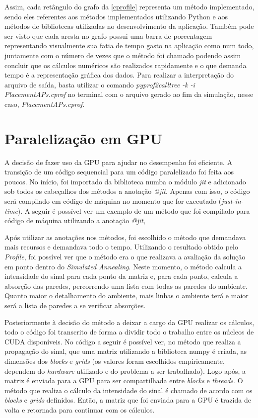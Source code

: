 \documentclass[
	12pt,				%
	twoside,			%
	a4paper,			%
	english,			%
	french,				%
	spanish,			%
	brazil				%
	]{abntex2}
\begin{document}
Assim, cada retângulo do grafo da \autoref{cprofile} representa um
método implementado, sendo eles referentes aos métodos implementados
utilizando Python e aos métodos de bibliotecas utilizadas no
desenvolvimento da aplicação. Também pode ser visto que cada aresta no
grafo possui uma barra de porcentagem representando visualmente sua
fatia de tempo gasto na aplicação como num todo, juntamente com o número
de vezes que o método foi chamado podendo assim concluir que os cálculos
numéricos são realizados rapidamente e o que demanda tempo é a
representação gráfica dos dados. Para realizar a interpretação do
arquivo de saída, basta utilizar o comando \emph{pyprof2calltree -k -i
PlacementAPs.cprof} no terminal com o arquivo gerado ao fim da
simulação, nesse caso, \emph{PlacementAPs.cprof}.

\section{Paralelização em GPU}\label{paralelizauxe7uxe3o-em-gpu}

A decisão de fazer uso da GPU para ajudar no desempenho foi eficiente. A
transição de um código sequencial para um código paralelizado foi feita
aos poucos. No início, foi importado da biblioteca numba o módulo
\emph{jit} e adicionado sob todos os cabeçalhos dos métodos a anotação
\emph{@jit}. Apenas com isso, o código será compilado em código de
máquina no momento que for executado (\emph{just-in-time}). A seguir é
possível ver um exemplo de um método que foi compilado para código de
máquina utilizando a anotação \emph{@jit},



Após utilizar as anotações nos métodos, foi escolhido o método que
demandava mais recursos e demandava todo o tempo. Utilizando o resultado
obtido pelo \emph{Profile}, foi possível ver que o método era o que
realizava a avaliação da solução em ponto dentro do \emph{Simulated
Annealing}. Neste momento, o método calcula a intensidade do sinal para
cada ponto da matriz e, para cada ponto, calcula a absorção das paredes,
percorrendo uma lista com todas as paredes do ambiente. Quanto maior o
detalhamento do ambiente, mais linhas o ambiente terá e maior será a
lista de paredes a se verificar absorções.

Posteriormente à decisão do método a deixar a cargo da GPU realizar os
cálculos, todo o código foi transcrito de forma a dividir todo o
trabalho entre os núcleos de CUDA disponíveis. No código a seguir é
possível ver, no método que realiza a propagação do sinal, que uma
matriz utilizando a biblioteca numpy é criada, as dimensões dos
\emph{blocks} e \emph{grids} (os valores foram escolhidos empiricamente,
dependem do \emph{hardware} utilizado e do problema a ser trabalhado).
Logo após, a matriz é enviada para a GPU para ser compartilhada entre
\emph{blocks} e \emph{threads}. O método que realiza o cálculo da
intensidade do sinal é chamado de acordo com os \emph{blocks} e
\emph{grids} definidos. Então, a matriz que foi enviada para a GPU é
trazida de volta e retornada para continuar com os cálculos.
\end{document}
